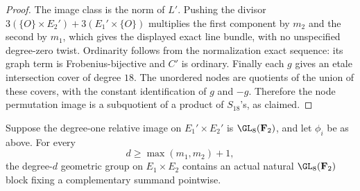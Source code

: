 \begin{proof}
The image class is the norm of $L'$.
Pushing the divisor $3(\{O\}\times E_2')+
3(E_1'\times\{O\})$ multiplies the first component by $m_2$
and the second by $m_1$, which gives the displayed exact
line bundle, with no unspecified degree-zero twist.
Ordinarity follows from the normalization exact sequence:
its graph term is Frobenius-bijective and $C'$ is ordinary.
Finally each $g$ gives an etale intersection cover of degree
$18$. The unordered nodes are quotients of the union of these
covers, with the constant identification of $g$ and $-g$.
Therefore the node permutation image is a subquotient of a
product of $S_{18}$'s, as claimed.
\end{proof}

\begin{lemma}
\label{lem:ordinary-product-isogeny-GL8-block}
Suppose the degree-one relative image on $E_1'\times E_2'$
is $\GL_8(\mathbf F_2)$, and let $\phi_i$ be as above.
For every
\[
                    d\ge \max(m_1,m_2)+1,
\]
the degree-$d$ geometric group on $E_1\times E_2$ contains
an actual natural $\GL_8(\mathbf F_2)$ block fixing a
complementary summand pointwise.
\end{lemma}

